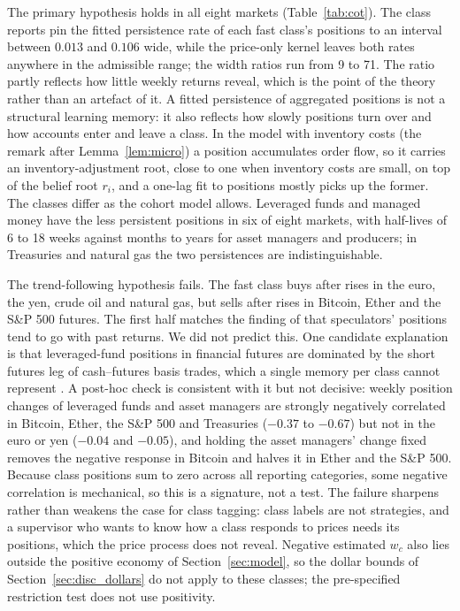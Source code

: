 The primary hypothesis holds in all eight markets (Table~\ref{tab:cot}). The class reports pin the fitted persistence rate of each fast class's positions to an interval between $0.013$ and $0.106$ wide, while the price-only kernel leaves both rates anywhere in the admissible range; the width ratios run from 9 to 71. The ratio partly reflects how little weekly returns reveal, which is the point of the theory rather than an artefact of it. A fitted persistence of aggregated positions is not a structural learning memory: it also reflects how slowly positions turn over and how accounts enter and leave a class. In the model with inventory costs (the remark after Lemma~\ref{lem:micro}) a position accumulates order flow, so it carries an inventory-adjustment root, close to one when inventory costs are small, on top of the belief root $r_i$, and a one-lag fit to positions mostly picks up the former. The classes differ as the cohort model allows. Leveraged funds and managed money have the less persistent positions in six of eight markets, with half-lives of 6 to 18 weeks against months to years for asset managers and producers; in Treasuries and natural gas the two persistences are indistinguishable.

The trend-following hypothesis fails. The fast class buys after rises in the euro, the yen, crude oil and natural gas, but sells after rises in Bitcoin, Ether and the S\&P 500 futures. The first half matches the finding of \citet{moskowitz2012} that speculators' positions tend to go with past returns. We did not predict this. One candidate explanation is that leveraged-fund positions in financial futures are dominated by the short futures leg of cash--futures basis trades, which a single memory per class cannot represent \citep{barth2021}. A post-hoc check is consistent with it but not decisive: weekly position changes of leveraged funds and asset managers are strongly negatively correlated in Bitcoin, Ether, the S\&P 500 and Treasuries ($-0.37$ to $-0.67$) but not in the euro or yen ($-0.04$ and $-0.05$), and holding the asset managers' change fixed removes the negative response in Bitcoin and halves it in Ether and the S\&P 500. Because class positions sum to zero across all reporting categories, some negative correlation is mechanical, so this is a signature, not a test. The failure sharpens rather than weakens the case for class tagging: class labels are not strategies, and a supervisor who wants to know how a class responds to prices needs its positions, which the price process does not reveal. Negative estimated $w_c$ also lies outside the positive economy of Section~\ref{sec:model}, so the dollar bounds of Section~\ref{sec:disc_dollars} do not apply to these classes; the pre-specified restriction test does not use positivity.

